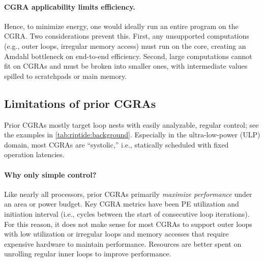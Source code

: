 
\paragraph{CGRA applicability limits efficiency.}
Hence, to minimize energy, one would ideally run an entire program on the CGRA.
%
Two considerations prevent this.
%
First, any unsupported computations (e.g., outer loops, irregular memory access)
must run on the core, creating an Amdahl bottleneck on end-to-end
efficiency.
%
Second, large computations cannot fit on CGRAs and must be broken
into smaller ones, with intermediate values spilled to scratchpads or main memory.


\subsection{Limitations of prior CGRAs}

Prior CGRAs mostly target loop nests with easily analyzable, regular control;
see the examples in \autoref{tab:riptide:background}.
%
Especially in the ultra-low-power (ULP) domain, 
most CGRAs are ``systolic,'' i.e., statically
scheduled with fixed operation latencies.

\paragraph{Why only simple control?}
Like nearly all processors, prior CGRAs primarily \emph{maximize
performance} under an area or power budget.
%
Key CGRA metrics have been PE utilization and initiation interval
(i.e., cycles between the start of consecutive loop iterations).
%
For this reason, it does not make sense for most CGRAs to support
outer loops with low utilization
or irregular loops and memory accesses that require expensive hardware to maintain performance.
%
Resources are better spent on unrolling regular inner loops to improve performance. %

